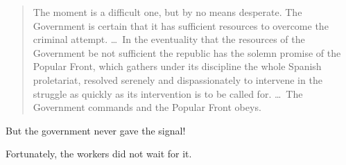 \begin{quotation}
  The moment is a difficult one, but by no means desperate. The Government is certain that it has sufficient resources to overcome the criminal attempt. \dots\ In the eventuality that the resources of the Government be not sufficient the republic has the solemn promise of the Popular Front, which gathers under its discipline the whole Spanish proletariat, resolved serenely and dispassionately to intervene in the struggle as quickly as its intervention is to be called for. \dots\ The Government commands and the Popular Front obeys.
\end{quotation}

\noindent
But the government never gave the signal!

\smallskip

\noindent
Fortunately, the workers did not wait for it.